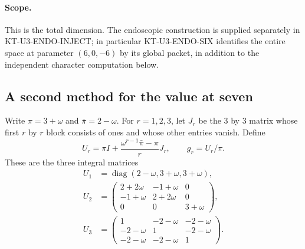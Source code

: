 \paragraph{Scope.}
This is the total dimension. The endoscopic construction is supplied
separately in KT-U3-ENDO-INJECT; in particular KT-U3-ENDO-SIX
identifies the entire space at parameter $(6,0,-6)$ by its global
packet, in addition to the independent character computation below.

\subsection{A second method for the value at seven}

Write $\pi=3+\omega$ and $\bar\pi=2-\omega$.
For $r=1,2,3$, let $J_r$ be the $3$ by $3$ matrix whose first
$r$ by $r$ block consists of ones and whose other entries vanish.
Define
\[
 U_r=\pi I+\frac{\omega^{r-1}\bar\pi-\pi}{r}J_r,
 \qquad g_r=U_r/\pi.
\]
These are the three integral matrices
\[
\begin{aligned}
U_1&=\operatorname{diag}(2-\omega,3+\omega,3+\omega),\\[3pt]
U_2&=\begin{pmatrix}2+2\omega&-1+\omega&0\\
-1+\omega&2+2\omega&0\\0&0&3+\omega\end{pmatrix},
\\[3pt]
U_3&=\begin{pmatrix}1&-2-\omega&-2-\omega\\
-2-\omega&1&-2-\omega\\-2-\omega&-2-\omega&1\end{pmatrix}.
\end{aligned}
\]

